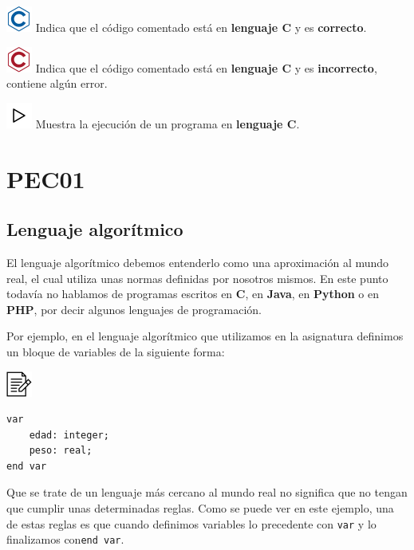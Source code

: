 \documentclass[
]{book}
\begin{document}
\includegraphics{./img/c.png} Indica que el código comentado está en \textbf{lenguaje C} y es \textbf{correcto}.

\includegraphics{./img/c_err.png} Indica que el código comentado está en \textbf{lenguaje C} y es \textbf{incorrecto}, contiene algún error.

\includegraphics{./img/play.png} Muestra la ejecución de un programa en \textbf{lenguaje C}.

\hypertarget{pec01}{%
\chapter{PEC01}\label{pec01}}

\hypertarget{lenguaje-algoruxedtmico}{%
\section{Lenguaje algorítmico}\label{lenguaje-algoruxedtmico}}

El lenguaje algorítmico debemos entenderlo como una aproximación al mundo real, el cual utiliza unas normas definidas por nosotros mismos. En este punto todavía no hablamos de programas escritos en \textbf{C}, en \textbf{Java}, en \textbf{Python} o en \textbf{PHP}, por decir algunos lenguajes de programación.

Por ejemplo, en el lenguaje algorítmico que utilizamos en la asignatura definimos un bloque de variables de la siguiente forma:

\includegraphics{./img/alg.png}

\begin{verbatim}
var
    edad: integer;
    peso: real;
end var
\end{verbatim}

Que se trate de un lenguaje más cercano al mundo real no significa que no tengan que cumplir unas determinadas reglas. Como se puede ver en este ejemplo, una de estas reglas es que cuando definimos variables lo precedente con \texttt{var} y lo finalizamos con\texttt{end\ var}.
\end{document}
